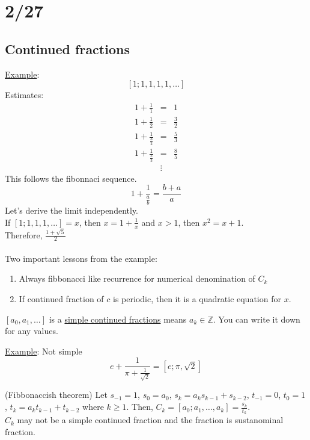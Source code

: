 \section*{2/27}
  \subsection*{Continued fractions}
    \underline{Example}:\\
    $$
      [1; 1, 1, 1, 1, \ldots]
    $$
    Estimates:
    \begin{eqnarray*}
      1 + \frac{1}{1} & = & 1\\
      1 + \frac{1}{2} & = & \frac{3}{2}\\
      1 + \frac{1}{\frac{3}{2}} & = & \frac{5}{3}\\
      1 + \frac{1}{\frac{5}{3}} & = & \frac{8}{5}\\
      & \vdots &
    \end{eqnarray*}
    This follows the fibonnaci sequence.\\
    $$
      1 + \frac{1}{\frac{a}{b}} = \frac{b+a}{a}
    $$
    Let's derive the limit independently.\\
    If $[1;1, 1, 1, \ldots] = x$, then
    $x = 1 + \frac{1}{x}$ and $ x > 1$, then $x^2 = x + 1$.\\
    Therefore, $\frac{1 + \sqrt{5}}{2}$\\\\
    Two important lessons from the example:
    \begin{enumerate}
      \item Always fibbonacci like recurrence for numerical denomination of
        $C_k$
      \item If continued fraction of $c$ is periodic, then it is a quadratic
        equation for $x$.
    \end{enumerate}
    \begin{definition} $[a_0, a_1, \ldots]$ is a \underline{simple continued 
      fractions} means $a_k \in \mathbb{Z}$. You can write it down for any 
      values.\\
    \end{definition} 
   \underline{Example}: Not simple
   $$
    e + \frac{1}{\pi + \frac{1}{\sqrt{2}}} = [e; \pi, \sqrt{2}]
   $$
   \begin{lemma}
    (Fibbonaccish theorem) Let $s_{-1} = 1$, $s_0 = a_0$, $s_k = a_ks_{k-1} +
    s_{k-2}$, $t_{-1} = 0$, $t_0 = 1$, $t_k = a_kt_{k-1} + t_{k-2}$ where
    $k \ge 1$. Then, $C_k = [a_0; a_1, \ldots, a_k] = \frac{s_k}{t_k}$.\\
    $C_k$ may not be a simple continued fraction and the fraction is
    sustanominal fraction.
   \end{lemma}

